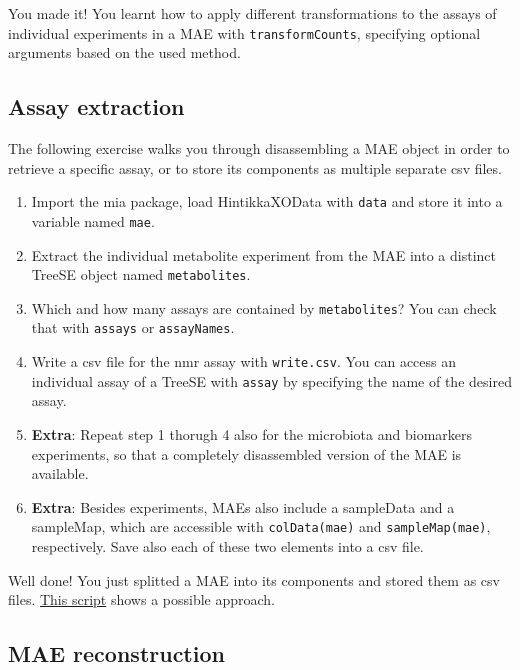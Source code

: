 \documentclass[
]{book}
\providecommand{\tightlist}{%
  \setlength{\itemsep}{0pt}\setlength{\parskip}{0pt}}
\begin{document}
You made it! You learnt how to apply different transformations to the assays
of individual experiments in a MAE with \texttt{transformCounts}, specifying optional
arguments based on the used method.

\hypertarget{assay-extraction}{%
\subsection{Assay extraction}\label{assay-extraction}}

The following exercise walks you through disassembling a MAE object in
order to retrieve a specific assay, or to store its components as
multiple separate csv files.

\begin{enumerate}
\def\labelenumi{\arabic{enumi}.}
\tightlist
\item
  Import the mia package, load HintikkaXOData with \texttt{data} and store it into a
  variable named \texttt{mae}.
\item
  Extract the individual metabolite experiment from the MAE into a distinct
  TreeSE object named \texttt{metabolites}.
\item
  Which and how many assays are contained by \texttt{metabolites}? You can check that
  with \texttt{assays} or \texttt{assayNames}.
\item
  Write a csv file for the nmr assay with \texttt{write.csv}. You can access an
  individual assay of a TreeSE with \texttt{assay} by specifying the name of the
  desired assay.
\item
  \textbf{Extra}: Repeat step 1 thorugh 4 also for the microbiota and biomarkers
  experiments, so that a completely disassembled version of the MAE is available.
\item
  \textbf{Extra}: Besides experiments, MAEs also include a sampleData and a sampleMap,
  which are accessible with \texttt{colData(mae)} and \texttt{sampleMap(mae)}, respectively.
  Save also each of these two elements into a csv file.
\end{enumerate}

Well done! You just splitted a MAE into its components and stored them as csv files.
\href{https://github.com/JuliaTurkuDataScience/MicrobiomeAnalysis.jl/blob/main/src/assets/XO_preprocess.R}{This script}
shows a possible approach.

\hypertarget{mae-reconstruction}{%
\subsection{MAE reconstruction}\label{mae-reconstruction}}
\end{document}
